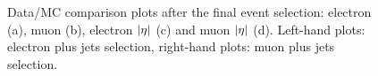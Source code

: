 \begin{figure}[htbp]
    \caption{Data/MC comparison plots after the final event selection: electron \pt (a), muon \pt (b), electron $\lvert \eta \rvert$ (c) and muon $\lvert \eta \rvert$ (d). Left-hand plots: electron plus jets selection, right-hand plots: muon plus jets selection.}
    \label{fig:contol_plots_leptons}
\end{figure}

\begin{figure}[htbp]
	\centering
  	\hfill
  	 \\
  	\hfill

\end{figure}
